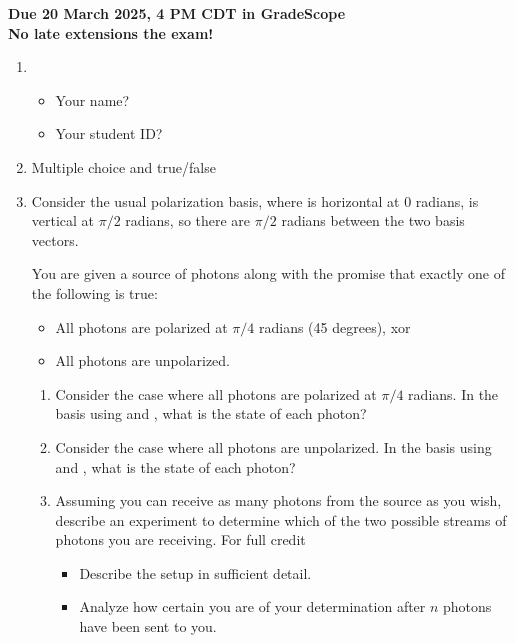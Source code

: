 \documentclass[12pt]{article}
\begin{document}

\begin{center}\bf
Due 20 March 2025, 4 PM CDT in GradeScope\\
No late extensions the exam!
\end{center}

\begin{enumerate}
    \item \begin{itemize}
    \item Your name? \Blank[3in]{}
    \item Your student ID? \Blank[3in]{}
\end{itemize}

\item {} Multiple choice and true/false

\item Consider the usual polarization basis, where \QZero{} is horizontal at 0 radians, \QOne{} is vertical at $\pi/2$ radians, so there are $\pi/2$ radians between the two basis vectors.

You are given a source of photons along with the promise that exactly one of the following is true:
\begin{itemize}
    \item All photons are polarized at $\pi/4$ radians (45 degrees), xor
    \item All photons are unpolarized.
\end{itemize}
\begin{enumerate}[label=\theenumi.\arabic*]
    \item Consider the case where all photons are polarized at $\pi/4$ radians.  In the basis using \QZero{} and \QOne{}, what is the state of each photon? 
    
    \Blank[5in]{}
    \item Consider the case where all photons are unpolarized.   In the basis using \QZero{} and \QOne{}, what is the state of each photon? 

    \Blank[5in]{}
    \item Assuming you can receive as many photons from the source as you wish, describe an experiment to determine which of the two possible streams of photons you are receiving.  For full credit
    \begin{itemize}
        \item Describe the setup in sufficient detail.
        \item Analyze how certain you are of your determination after $n$ photons have been sent to you. 
    \end{itemize}


\end{enumerate}
\end{enumerate}
\end{document}
